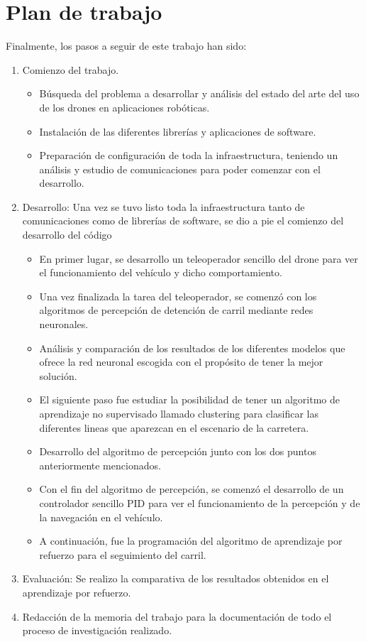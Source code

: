 \section{Plan de trabajo}
\label{sec:plantrabajo}

Finalmente, los pasos a seguir de este trabajo han sido: 
\begin{enumerate}
    \item Comienzo del trabajo. 
    \begin{itemize}
        \item Búsqueda del problema a desarrollar y análisis del estado del arte del uso de los drones en aplicaciones robóticas.
        \item Instalación de las diferentes librerías y aplicaciones de software. 
        \item Preparación de configuración de toda la infraestructura, teniendo un análisis y estudio de comunicaciones para poder comenzar con el desarrollo. 
    \end{itemize}
    \item Desarrollo: Una vez se tuvo listo toda la infraestructura tanto de comunicaciones como de librerías de software, se dio a pie el comienzo del desarrollo del código
        \begin{itemize}
            \item En primer lugar, se desarrollo un teleoperador sencillo del drone para ver el funcionamiento del vehículo y dicho comportamiento.
            \item Una vez finalizada la tarea del teleoperador, se comenzó con los algoritmos de percepción de detención de carril mediante redes neuronales.
            \item Análisis y comparación de los resultados de los diferentes modelos que ofrece la red neuronal escogida con el propósito de tener la mejor solución. 
            \item El siguiente paso fue estudiar la posibilidad de tener un algoritmo de aprendizaje no supervisado llamado clustering para clasificar las diferentes lineas que aparezcan en el escenario de la carretera.
            \item Desarrollo del algoritmo de percepción junto con los dos puntos anteriormente mencionados.
            \item Con el fin del algoritmo de percepción, se comenzó el desarrollo de un controlador sencillo PID para ver el funcionamiento de la percepción y de la navegación en el vehículo. 
            \item A continuación, fue la programación del algoritmo de aprendizaje por refuerzo para el seguimiento del carril.
        \end{itemize}
    \item Evaluación: Se realizo la comparativa de los resultados obtenidos en el aprendizaje por refuerzo.
        
    \item Redacción de la memoria del trabajo para la documentación de todo el proceso de investigación realizado. 
\end{enumerate}


